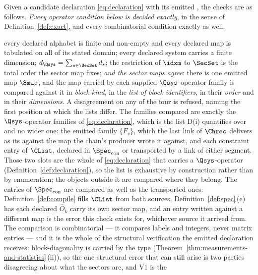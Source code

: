 \begin{definition}\label{def:validator}
Given a candidate declaration \eqref{eq:declaration} with its emitted
, the checks are as follows. \emph{Every operator condition
below is decided exactly}, in the sense of Definition~\ref{def:exact}, and
every combinatorial condition exactly as well.
\begin{description}[leftmargin=3.0em,style=nextline]
\item[V1 (finiteness, totality, and the \tref{sector map})] every declared alphabet is
  finite and non-empty and every declared map is tabulated on all of its stated
  domain; every declared system carries a finite dimension;
  $d_{\Qsys}=\sum_{s\in\SecSet}d_s$; the restriction of $\idxm$ to $\SecSet$ is
  the total order the sector map fixes; \emph{and the sector maps
  agree}: there is one emitted map $\Smap$, and the map carried by each
  supplied $\Qsys$-operator family is compared against it in \emph{block
  kind}, in the \emph{list of block identifiers}, in their \emph{order} and in
  their \emph{dimensions}. A disagreement on any of the four is refused,
  naming the first position at which the lists differ. The families compared
  are exactly the $\Qsys$-operator families of \eqref{eq:declaration}, which
  is the list D(i) quantifies over and no wider one: the emitted family
  $\{F_v\}$, which the last link of $\Chrec$ delivers as its 
  against the map the chain's producer wrote it against, and each constraint
  entry of $\CList$, declared in $\Spec_{\mathrm{con}}$ or transported by a
  link of either segment. Those two slots are the whole of
  \eqref{eq:declaration} that carries a $\Qsys$-operator
  (Definition~\ref{def:declaration}), so the list is exhaustive by
  construction rather than by enumeration; the objects outside it are compared
  where they belong. The entries of
  $\Spec_{\mathrm{con}}$ are compared as well as the transported ones:
  Definition~\ref{def:compile} fills $\CList$ from both sources,
  Definition~\ref{def:spec}\,(e) has each declared $\hat O_k$ carry its own
  sector map, and an entry written against a different map is the error this
  check exists for, whichever source it arrived from. The comparison is
  combinatorial --- it compares labels and integers, never matrix entries ---
  and it is the whole of the structural verification the emitted declaration
  receives: block-diagonality is carried by the type
  (Theorem~\ref{thm:measurements-and-statistics}\,(ii)), so the one structural error that can still
  arise is two parties disagreeing about what the sectors are, and V1 is the

\end{description}
\end{definition}
